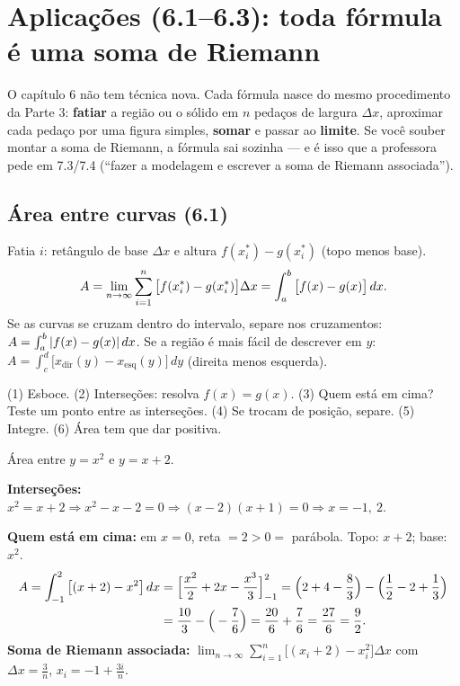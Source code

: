 \section[Aplicações (6.1--6.3)]{Aplicações (6.1--6.3): toda fórmula é uma soma de Riemann}

O capítulo 6 não tem técnica nova. Cada fórmula nasce do mesmo procedimento da Parte 3: \textbf{fatiar} a região ou o sólido em $n$ pedaços de largura $\Delta x$, aproximar cada pedaço por uma figura simples, \textbf{somar} e passar ao \textbf{limite}. Se você souber montar a soma de Riemann, a fórmula sai sozinha --- e é isso que a professora pede em 7.3/7.4 (``fazer a modelagem e escrever a soma de Riemann associada'').

\subsection{Área entre curvas (6.1)}

\begin{definicao}[{Área entre $y=f(x)$ (em cima) e $y=g(x)$ (embaixo), $a\le x\le b$}]
Fatia $i$: retângulo de base $\Delta x$ e altura $f(x_i^*)-g(x_i^*)$ (topo menos base).
\[
A=\lim_{n\to\infty}\sum_{i=1}^n\big[f(x_i^*)-g(x_i^*)\big]\Delta x=\int_a^b\big[f(x)-g(x)\big]\,dx .
\]
Se as curvas se cruzam dentro do intervalo, separe nos cruzamentos: $A=\int_a^b|f(x)-g(x)|\,dx$. Se a região é mais fácil de descrever em $y$: $A=\displaystyle\int_c^d\big[x_{\text{dir}}(y)-x_{\text{esq}}(y)\big]\,dy$ (direita menos esquerda).
\end{definicao}

\begin{metodo}[{Roteiro}]
(1) Esboce. (2) Interseções: resolva $f(x)=g(x)$. (3) Quem está em cima? Teste um ponto entre as interseções. (4) Se trocam de posição, separe. (5) Integre. (6) Área tem que dar positiva.
\end{metodo}

\begin{exemplo}
Área entre $y=x^2$ e $y=x+2$.

\textbf{Interseções:} $x^2=x+2\Rightarrow x^2-x-2=0\Rightarrow(x-2)(x+1)=0\Rightarrow x=-1,\ 2$.

\textbf{Quem está em cima:} em $x=0$, reta $=2>0=$ parábola. Topo: $x+2$; base: $x^2$.
\begin{align*}
A=\int_{-1}^{2}\big[(x+2)-x^2\big]\,dx&=\Big[\frac{x^2}{2}+2x-\frac{x^3}{3}\Big]_{-1}^{2}
=\Big(2+4-\frac83\Big)-\Big(\frac12-2+\frac13\Big)\\
&=\frac{10}{3}-\Big(-\frac76\Big)=\frac{20}{6}+\frac76=\frac{27}{6}=\frac92 .
\end{align*}
\textbf{Soma de Riemann associada:} $\displaystyle\lim_{n\to\infty}\sum_{i=1}^n\big[(x_i+2)-x_i^2\big]\Delta x$ com $\Delta x=\frac3n$, $x_i=-1+\frac{3i}{n}$.
\end{exemplo}

